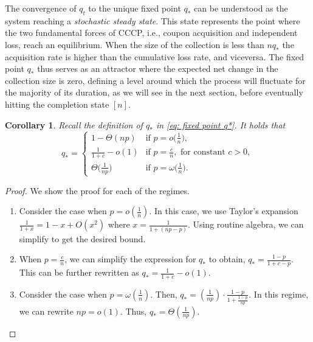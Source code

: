 \documentclass[11pt,a4paper]{article}
\newtheorem{corollary}[theorem]{Corollary}
\begin{document}
The convergence of $q_t$ to the unique fixed point $q_*$ can be understood as the system reaching a \textit{stochastic steady state}. This state represents the point where the two fundamental forces of CCCP, i.e., coupon acquisition and independent loss, reach an equilibrium. When the size of the collection is less than $nq_*$ the acquisition rate is higher than the cumulative loss rate, and viceversa. The fixed point $q_*$ thus serves as an attractor where the expected net change in the collection size is zero, defining a level around which the process will fluctuate for the majority of its duration, as we will see in the next section, before eventually hitting the completion state $[n]$.


\begin{corollary}\label{coro: metastable regimes}
Recall the definition of $q_*$ in \cref{eq: fixed point q*}.
It holds that
\[
q_* = \begin{cases}
    1-\Theta(np) & \text{if } p=o\big(\frac{1}{n}\big),
    \\
    \frac{1}{1+c} - o(1) & \text{if } p=\frac{c}{n}, \text{ for constant $c>0$},
    \\
    \Theta\big(\frac{1}{np}\big) & \text{if } p=\omega\big(\frac{1}{n}\big).
\end{cases}
\]
\end{corollary}
\begin{proof} 
We show the proof for each of the regimes.
\begin{enumerate}
\item Consider the case when $p=o(\frac{1}{n})$. In this case, we use Taylor's expansion $\frac{1}{1+x}=1-x+O(x^2)$ where $x=\frac{1}{1+(np-p)}$. Using routine algebra, we can simplify to get the desired bound. 
\item When $p=\frac{c}{n}$, we can simplify the expression for $q_*$ to obtain, $q_{*}=\frac{1-p}{1+c-p}$. This can be further rewritten as $q_*=\frac{1}{1+c}-o(1)$.
\item Consider the case when $p=\omega(\frac{1}{n})$. Then,
$ q_*=(\frac{1}{np})\cdot \frac{1-p}{1+\frac{1-p}{np}}$. In this regime, we can rewrite $np=o(1)$. Thus, $q_*=\Theta(\frac{1}{np})$.
\qedhere
\end{enumerate}
\end{proof}
\end{document}
